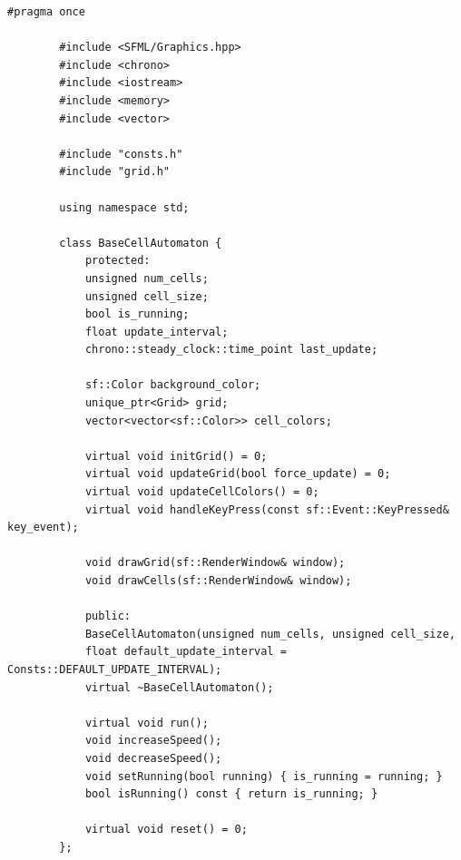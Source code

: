 \documentclass[14pt,a4paper]{extarticle}
\theoremstyle{plain}
\begin{document}
	\begin{lstlisting}[title=base.h, gobble=16, breaklines=true, showspaces=false, showtabs=false, breakatwhitespace=true]
		#pragma once
		
		#include <SFML/Graphics.hpp>
		#include <chrono>
		#include <iostream>
		#include <memory>
		#include <vector>
		
		#include "consts.h"
		#include "grid.h"
		
		using namespace std;
		
		class BaseCellAutomaton {
			protected:
			unsigned num_cells;
			unsigned cell_size;
			bool is_running;
			float update_interval;
			chrono::steady_clock::time_point last_update;
			
			sf::Color background_color;
			unique_ptr<Grid> grid;
			vector<vector<sf::Color>> cell_colors;
			
			virtual void initGrid() = 0;
			virtual void updateGrid(bool force_update) = 0;
			virtual void updateCellColors() = 0;
			virtual void handleKeyPress(const sf::Event::KeyPressed& key_event);
			
			void drawGrid(sf::RenderWindow& window);
			void drawCells(sf::RenderWindow& window);
			
			public:
			BaseCellAutomaton(unsigned num_cells, unsigned cell_size,
			float default_update_interval = Consts::DEFAULT_UPDATE_INTERVAL);
			virtual ~BaseCellAutomaton();
			
			virtual void run();
			void increaseSpeed();
			void decreaseSpeed();
			void setRunning(bool running) { is_running = running; }
			bool isRunning() const { return is_running; }
			
			virtual void reset() = 0;
		};
	\end{lstlisting}
	
\end{document}
